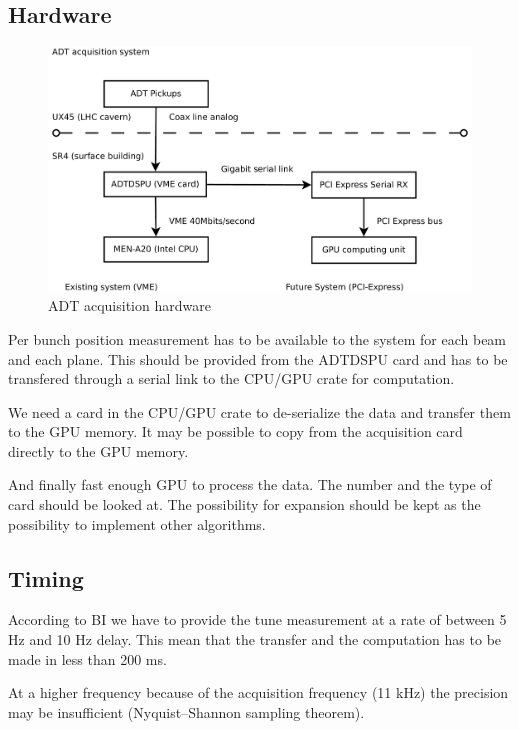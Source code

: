    \subsection{Hardware}

   \begin{figure}[H]
	\caption{ADT acquisition hardware}
	\centering
	\includegraphics[scale=0.3]{acquisition.pdf}
	\end{figure}

   Per bunch position measurement has to be available to the system for each beam and each plane. This should be provided from the ADTDSPU card and has to be transfered through a serial link to the CPU/GPU crate for computation.

   We need a card in the CPU/GPU crate to de-serialize the data and transfer them to the GPU memory. It may be possible to copy from the acquisition card directly to the GPU memory.

   And finally fast enough GPU to process the data. The number and the type of card should be looked at. The possibility for expansion should be kept as the possibility to implement other algorithms.
   
   \subsection{Timing}

   According to \gls{BI} we have to provide the tune measurement at a rate of between 5 Hz and 10 Hz delay. This mean that the transfer and the computation has to be made in less than 200 ms.

   At a higher frequency because of the acquisition frequency (11 kHz) the precision may be insufficient (Nyquist–Shannon sampling theorem).